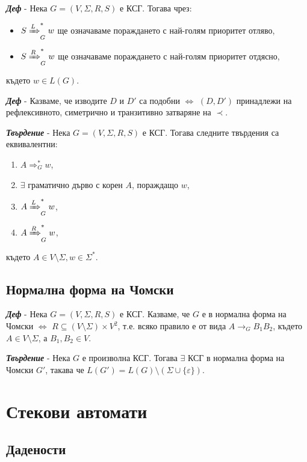 \documentclass[fleqn,12pt]{article}
\begin{document}
\begin{flushleft}
\textit{\textbf{Деф}} - Нека $G = (V, \Sigma, R, S)$ е КСГ. Тогава чрез:
\begin{itemize}
    \item $S \xRightarrow[]{L}_G^* w$ ще означаваме пораждането с най-голям приоритет отляво,
    \item $S \xRightarrow[]{R}_G^* w$ ще означаваме пораждането с най-голям приоритет отдясно,
\end{itemize} 
където $w \in L(G)$.

\textit{\textbf{Деф}} - Казваме, че изводите $D$ и $D'$ са подобни $\iff$ $(D, D')$ принадлежи на рефлексивното, симетрично и транзитивно затваряне на $\prec$.

\textit{\textbf{Твърдение}} - Нека $G = (V, \Sigma, R, S)$ е КСГ. Тогава следните твърдения са еквивалентни:
\begin{enumerate}
    \item $A \Rightarrow_G^* w$,
    \item $\exists$ граматично дърво с корен $A$, пораждащо $w$,
    \item $A \xRightarrow[]{L}_G^* w$,
    \item $A \xRightarrow[]{R}_G^* w$,
\end{enumerate}
където $A \in V \setminus \Sigma, w \in \Sigma^*$.

\subsection{Нормална форма на Чомски}

\textit{\textbf{Деф}} - Нека $G = (V, \Sigma, R, S)$ е КСГ. Казваме, че $G$ е в нормална форма на Чомски $\iff$ $R \subseteq (V \setminus \Sigma) \times V^2$, т.е. всяко правило е от вида $A \to_G B_1B_2$, където $A \in V \setminus \Sigma$, а $B_1, B_2 \in V$.

\textit{\textbf{Твърдение}} - Нека $G$ е произволна КСГ. Тогава $\exists$ КСГ в нормална форма на Чомски $G'$, такава че $L(G') = L(G) \setminus (\Sigma \cup \{\varepsilon\})$.

\section{Стекови автомати}

\subsection{Дадености}


\end{flushleft}
\end{document}

